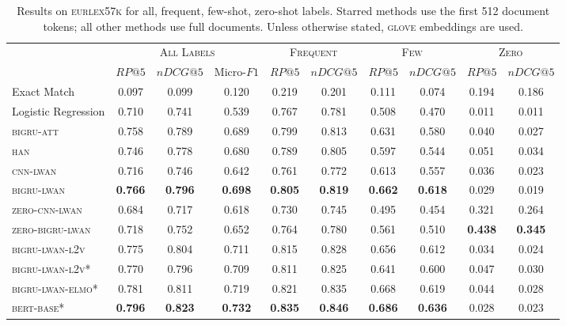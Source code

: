 \documentclass[11pt,a4paper]{article}
\newcommand{\bigruatt}{\textsc{bigru-att}\xspace}
\newcommand{\han}{\textsc{han}\xspace}
\newcommand{\lwancnn}{\textsc{cnn-lwan}\xspace}
\newcommand{\zlwancnn}{\textsc{zero-cnn-lwan}\xspace}
\newcommand{\lwangru}{\textsc{bigru-lwan}\xspace}
\newcommand{\lwangrulv}{\textsc{bigru-lwan-l2v}}
\newcommand{\lwangruelmo}{\textsc{bigru-lwan-elmo}}
\newcommand{\zlwangru}{\textsc{zero-bigru-lwan}\xspace}
\newcommand{\glove}{\textsc{glove}\xspace}
\newcommand{\bertbase}{\textsc{bert-base}\xspace}
\newcommand{\newdata}{\textsc{eurlex57k}\xspace}
\begin{document}
\begin{table*}[ht!]
\centering
{
\footnotesize\addtolength{\tabcolsep}{-2pt}
\begin{tabular}{lccccccccc}
  \hline
  & \multicolumn{3}{c}{\textsc{All Labels}} & \multicolumn{2}{c}{\textsc{Frequent}} & \multicolumn{2}{c}{\textsc{Few}} & \multicolumn{2}{c}{\textsc{Zero}} \\ 
  & $RP@5$ & $nDCG@5$ & Micro-$F1$ & $RP@5$ & $nDCG@5$ & $RP@5$ & $nDCG@5$ & $RP@5$ & $nDCG@5$ \\
  \cline{2-10}
  Exact Match & 0.097 & 0.099 & 0.120 & 0.219 & 0.201 & 0.111 & 0.074 & 0.194 & 0.186 \\
  Logistic Regression & 0.710 & 0.741 & 0.539 & 0.767 & 0.781 & 0.508 & 0.470 & 0.011 & 0.011 \\
  \hline
  \bigruatt & 0.758 & 0.789 & 0.689 & 0.799 & 0.813 & 0.631 & 0.580 & 0.040 & 0.027\\
  \han & 0.746 & 0.778 & 0.680 & 0.789 & 0.805 & 0.597 & 0.544 & 0.051 & 0.034\\
  \hline
 \lwancnn & 0.716 & 0.746 & 0.642 & 0.761 & 0.772 & 0.613 & 0.557 & 0.036  & 0.023 \\
  \lwangru & \textbf{0.766} & \textbf{0.796} & \textbf{0.698} & \textbf{0.805} & \textbf{0.819} & \textbf{0.662} & \textbf{0.618} & 0.029 & 0.019\\
   \hline
  \zlwancnn & 0.684 & 0.717 & 0.618 & 0.730 & 0.745 & 0.495 & 0.454 & 0.321 & 0.264 \\
  \zlwangru & 0.718 & 0.752 & 0.652  & 0.764 & 0.780 & 0.561 & 0.510 & \textbf{0.438} & \textbf{0.345} \\
  \hline
  \hline
 \lwangrulv & 0.775 & 0.804 & 0.711 & 0.815 & 0.828 & 0.656 & 0.612  & 0.034 & 0.024 \\
\hline
\lwangrulv* & 0.770 & 0.796 & 0.709 & 0.811 & 0.825 & 0.641 & 0.600 & 0.047 & 0.030\\
\lwangruelmo* & 0.781 & 0.811 & 0.719 & 0.821 & 0.835 & 0.668 & 0.619 & 0.044 & 0.028\\
\bertbase * & \textbf{0.796} & \textbf{0.823} & \textbf{0.732} & \textbf{0.835} & \textbf{0.846} & \textbf{0.686} & \textbf{0.636} & 0.028 & 0.023\\
\hline
\end{tabular}
}
\caption{Results on \newdata for all, frequent, few-shot, zero-shot labels. Starred methods use the first 512 document tokens; all other methods use full documents. Unless otherwise stated, \glove embeddings are used.}
\vspace*{-4mm}
\label{tab:results}
\end{table*}
\end{document}
